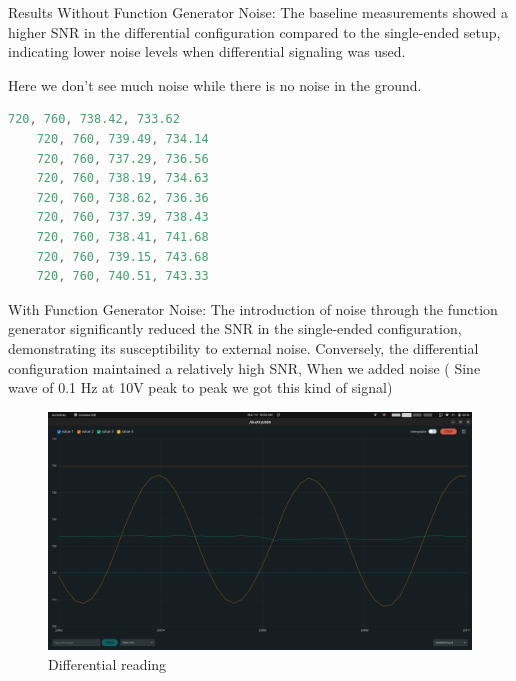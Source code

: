 \documentclass[a4paper,11pt]{article}%
\begin{document}
Results
Without Function Generator Noise: The baseline measurements showed a higher SNR in the differential configuration compared to the single-ended setup, indicating lower noise levels when differential signaling was used.

Here we don't see much noise while there is no noise in the ground.
\begin{lstlisting}[language=C]
	720, 760, 738.42, 733.62
	720, 760, 739.49, 734.14
	720, 760, 737.29, 736.56
	720, 760, 738.19, 734.63
	720, 760, 738.62, 736.36
	720, 760, 737.39, 738.43
	720, 760, 738.41, 741.68
	720, 760, 739.15, 743.68
	720, 760, 740.51, 743.33
\end{lstlisting}

With Function Generator Noise: The introduction of noise through the function generator significantly reduced the SNR in the single-ended configuration, demonstrating its susceptibility to external noise. Conversely, the differential configuration maintained a relatively high SNR, When we added noise ( Sine wave of 0.1 Hz at 10V peak to peak we got this kind of signal)
\begin{figure}[!h]
	\centering
	\includegraphics[scale=0.24]{figures/differential.png}
	\caption{Differential reading}

\end{figure}
\end{document}
